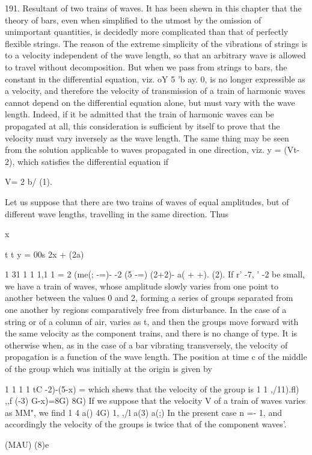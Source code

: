 191. Resultant of two trains of waves.
It has been shewn in this chapter that the theory of bars, even
when simplified to the utmost by the omission of unimportant quantities,
is decidedly more complicated than that of perfectly flexible strings.
The reason of the extreme simplicity of the vibrations of strings is to
a velocity independent of the wave length, so that an arbitrary wave is
allowed to travel without decomposition. But when we pass from strings
to bars, the constant in the differential equation, viz. oY 5 'b ay. 0,
is no longer expressible as a velocity, and therefore the velocity of
transmission of a train of harmonic waves cannot depend on the
differential equation alone, but must vary with the wave length. Indeed,
if it be admitted that the train of harmonic waves can be propagated at
all, this consideration is sufficient by itself to prove that the
velocity must vary inversely as the wave length. The same thing may be
seen from the solution applicable to waves propagated in one direction,
viz. y = (Vt- 2), which satisfies the differential equation if

V= 2 b/ (1).

Let us suppose that there are two trains of waves of equal amplitudes,
but of different wave lengths, travelling in the same direction. Thus

x


t t y = 00s 2x + (2a)

1 31 1 1 1,1 1 = 2 (me(; -=)- -2 (5 -=) (2+2)- a( + +). (2). If r' -7, '
-2 be small, we have a train of waves, whose amplitude slowly varies
from one point to another between the values 0 and 2, forming a series
of groups separated from one another by
regions comparatively free from disturbance. In the case of a string or
of a column of air, varies as t, and then the groups move
forward with the same velocity as the component trains, and there is no
change of type. It is otherwise when, as in the case of a bar vibrating
transversely, the velocity of propagation is a function of the wave
length. The position at time c of the middle of the group which was
initially at the origin is given by

1 1 1 1 tC -2)-(5-x) =
which shews that the velocity of the group is 1 1 ,/11).fl) ,,f (-3) G-x)=8G) 8G)
If we suppose that the velocity V of a train of waves varies
as MM", we find 1 4 a() 4G) 1, ,/l a(3) a(;) In the present case n =- 1,
and accordingly the velocity of the groups is twice that of the
component waves'.

(MAU) (8)e


